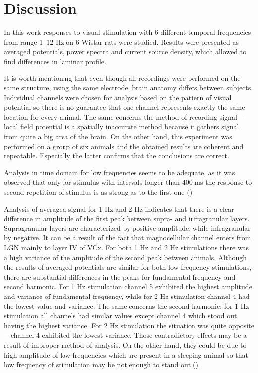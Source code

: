 \documentclass{pracalicmgr}
\begin{document}
    \chapter{Discussion}
    In this work responses to visual stimulation with 6 different temporal frequencies from range 1--12 Hz on 6 Wistar rats were studied. Results were presented as averaged potentials, power spectra and current source density, which allowed to find differences in laminar profile.
    
    It is worth mentioning that even though all recordings were performed on the same structure, using the same electrode, brain anatomy differs between subjects. Individual channels were chosen for analysis based on the pattern of visual potential so there is no guarantee that one channel represents exactly the same location for every animal. The same concerns the method of recording signal---local field potential is a spatially inaccurate method because it gathers signal from quite a big area of the brain. On the other hand, this experiment was performed on a group of six animals and the obtained results are coherent and repeatable. Especially the latter confirms that the conclusions are correct. 
    
    Analysis in time domain for low frequencies seems to be adequate, as it was observed that only for stimulus with intervals longer than 400 ms the response to second repetition of stimulus is as strong as to the first one (\cite{retino}).
    
    Analysis of averaged signal for 1 Hz and 2 Hz indicates that there is a clear difference in amplitude of the first peak between supra- and infragranular layers. Supragranular layers are characterized by positive amplitude, while infragranular by negative. It can be a result of the fact that magnocellular channel enters from LGN mainly to layer IV of VCx. For both 1 Hz and 2 Hz stimulations there was a high variance of the amplitude of the second peak between animals. Although the results of averaged potentials are similar for both low-frequency stimulations, there are substantial differences in the peaks for fundamental frequency and second harmonic. For 1 Hz stimulation channel 5 exhibited the highest amplitude and variance of fundamental frequency, while for 2 Hz stimulation channel 4 had the lowest value and variance. The same concerns the second harmonic: for 1 Hz stimulation all channels had similar values except channel 4 which stood out having the highest variance. For 2 Hz stimulation the situation was quite opposite---channel 4 exhibited the lowest variance. Those contradictory effects may be a result of improper method of analysis. On the other hand, they could be due to high amplitude of low frequencies which are present in a sleeping animal so that low frequency of stimulation may be not enough to stand out (\cite{sellers, ja}).
    
\end{document}
